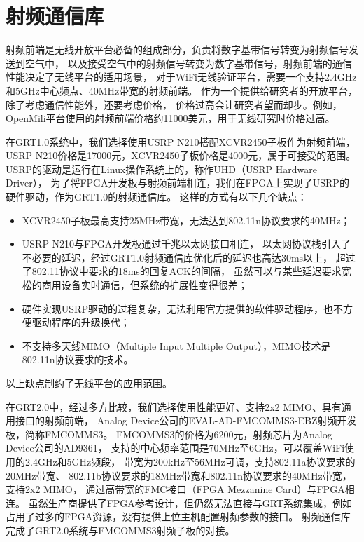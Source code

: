 	\section{射频通信库}\label{sec:grt2.0_rfd}
	射频前端是无线开放平台必备的组成部分，负责将数字基带信号转变为射频信号发送到空气中，
	以及接受空气中的射频信号转变为数字基带信号，射频前端的通信性能决定了无线平台的适用场景，
	对于WiFi无线验证平台，需要一个支持2.4GHz和5GHz中心频点、40MHz带宽的射频前端。
	作为一个提供给研究者的开放平台，除了考虑通信性能外，还要考虑价格，
	价格过高会让研究者望而却步。例如，OpenMili平台使用的射频前端\cite{mobicom16openmili}价格约11000美元，用于无线研究时价格过高。

	在GRT1.0系统中，我们选择使用USRP N210搭配XCVR2450子板\cite{usrpn210}作为射频前端，
	USRP N210价格是17000元，XCVR2450子板价格是4000元，属于可接受的范围。
	USRP的驱动是运行在Linux操作系统上的，称作UHD（USRP Hardware Driver），
	为了将FPGA开发板与射频前端相连，我们在FPGA上实现了USRP的硬件驱动，作为GRT1.0的射频通信库。
	这样的方式有以下几个缺点：
		\begin{itemize}
			\item XCVR2450子板最高支持25MHz带宽，无法达到802.11n协议要求的40MHz；
			\item USRP N210与FPGA开发板通过千兆以太网接口相连，
			以太网协议栈引入了不必要的延迟，经过GRT1.0射频通信库优化后的延迟也高达30ms以上，
			超过了802.11协议中要求的18ms的回复ACK的间隔，
			虽然可以与某些延迟要求宽松的商用设备实时通信，但系统的扩展性变得很差；
			\item 硬件实现USRP驱动的过程复杂，无法利用官方提供的软件驱动程序，也不方便驱动程序的升级换代；
			\item 不支持多天线MIMO（Multiple Input Multiple Output），MIMO技术是802.11n协议要求的技术。
		\end{itemize}

	以上缺点制约了无线平台的应用范围。

	在GRT2.0中，经过多方比较，我们选择使用性能更好、支持2x2 MIMO、具有通用接口的射频前端，
	Analog Device公司的EVAL-AD-FMCOMMS3-EBZ射频开发板\cite{fmcomms3}，简称FMCOMMS3。
	FMCOMMS3的价格为6200元，射频芯片为Analog Device公司的AD9361，
	支持的中心频率范围是70MHz至6GHz，可以覆盖WiFi使用的2.4GHz和5GHz频段，
	带宽为200kHz至56MHz可调，支持802.11a协议要求的20MHz带宽、
	802.11b协议要求的18MHz带宽和802.11n协议要求的40MHz带宽，支持2x2 MIMO，
	通过高带宽的FMC接口（FPGA Mezzanine Card）\cite{wikifmc}与FPGA相连。
	虽然生产商提供了FPGA参考设计，但仍然无法直接与GRT系统集成，例如占用了过多的FPGA资源，没有提供上位主机配置射频参数的接口。
	射频通信库完成了GRT2.0系统与FMCOMMS3射频子板的对接。

